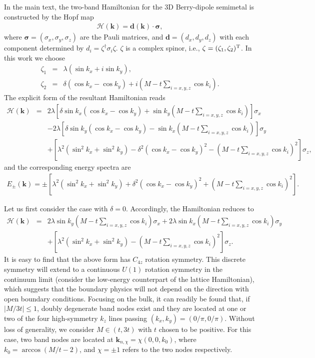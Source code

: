 \documentclass[aps,prl,twocolumn,longbibliography]{revtex4-1}
\newcommand{\bk}{\boldsymbol k}
\newcommand{\bd}{\boldsymbol d}
\begin{document}
\begin{widetext}
In the main text, the two-band Hamiltonian for the 3D Berry-dipole semimetal is constructed by the Hopf map
\begin{eqnarray}
	\mathcal{H}(\bk)=\bd(\bk)\cdot\boldsymbol{\sigma},
\end{eqnarray}
where $\boldsymbol{\sigma}=(\sigma_{x},\sigma_{y},\sigma_{z})$ are the Pauli matrices, and $\bd=(d_{x},d_{y},d_{z})$ with each component determined by $d_{i}=\zeta^\dagger\sigma_{i}\zeta$.  $\zeta$ is a complex spinor, i.e., $\zeta=(\zeta_{1},\zeta_{2})^{\rm T}$. In this work we choose
\begin{eqnarray}
	\zeta_{1}&=&\lambda(\sin k_{x}+i\sin k_{y}),\\
	\zeta_{2}&=&\delta(\cos k_{x}-\cos k_{y})+i(M-t\sum_{i=x,y,z}\cos k_{i}).
\end{eqnarray}
The explicit form of the resultant Hamiltonian reads
\begin{eqnarray}
	\mathcal{H}(\bk)&=&2\lambda\left[\delta\sin k_{x}(\cos k_{x}-\cos k_{y})+\sin k_{y} (M-t\sum_{i=x,y,z}\cos k_{i})\right]\sigma_{x}\nonumber\\
	&&-2\lambda\left[\delta\sin k_{y}(\cos k_{x}-\cos k_{y})-\sin k_{x}(M-t\sum_{i=x,y,z}\cos k_{i})\right]\sigma_{y}\nonumber\\
	&&+\left[\lambda^{2}(\sin^{2}k_{x}+\sin^{2}k_{y})-\delta^{2}(\cos k_{x}-\cos k_{y})^{2}-(M-t\sum_{i=x,y,z}\cos k_{i})^{2}\right]\sigma_{z},
	\label{eq: latticeH}
\end{eqnarray}
and the corresponding energy spectra are
\begin{eqnarray}
	E_{\pm}(\bk)=\pm\left[\lambda^{2}(\sin^{2}k_{x}+\sin^{2} k_{y})+\delta^{2}(\cos k_{x}-\cos k_{y})^{2}+(M-t\sum_{i=x,y,z}\cos k_{i})^{2}\right].
\end{eqnarray}


Let us first consider the case with $\delta=0$. Accordingly, the Hamiltonian reduces to
\begin{eqnarray}
	\mathcal{H}(\bk)&=&2\lambda\sin k_{y} (M-t\sum_{i=x,y,z}\cos k_{i})\sigma_{x}
	+2\lambda\sin k_{x}(M-t\sum_{i=x,y,z}\cos k_{i})\sigma_{y}\nonumber\\
	&&+\left[\lambda^{2}(\sin^{2}k_{x}+\sin^{2}k_{y})-(M-t\sum_{i=x,y,z}\cos k_{i})^{2}\right]\sigma_{z}.
	\label{eq: H_delta0}
\end{eqnarray}
It is easy to find that the above form has $C_{4z}$ rotation symmetry. This discrete symmetry will extend to a continuous
$U(1)$ rotation symmetry in the continuum limit (consider the low-energy counterpart of the lattice Hamiltonian), which
suggests that the boundary physics will not depend on the direction with open boundary conditions. Focusing on the bulk, it can readily be
 found that, if $|M/3t|\leq1$,  doubly degenerate band nodes exist and they are located at one or two of the four high-symmetry $k_{z}$ lines passing $(k_{x},k_{y})=(0/\pi,0/\pi)$. Without loss of generality, we consider $M\in (t,3t)$ with $t$ chosen to be positive. For this case, two band nodes are located at $\bk_{n,\chi}=\chi(0,0,k_{0})$, where $k_{0}=\arccos(M/t-2)$, and $\chi=\pm1$ refers to the two nodes respectively.




\end{widetext}
\end{document}
